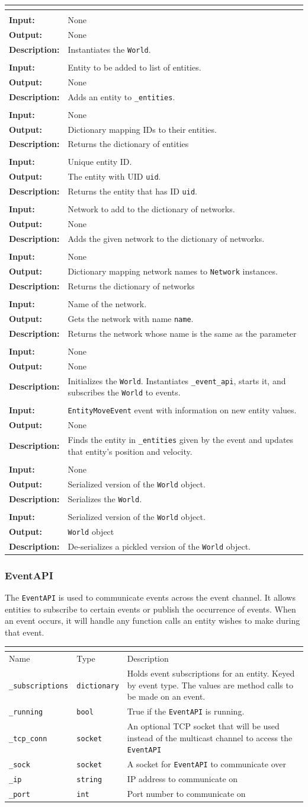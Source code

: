 \documentclass[titlepage]{article}
\newcommand{\operations}[1]{
\begin{center}
    \begin{longtable}{|p{4cm}|p{10cm + 2.0\tabcolsep}|}
    \hline
    \multicolumn{2}{|l|}{\cellcolor[gray]{0.5}{\textbf{Operations}}} \\ \hline
#1
    \end{longtable}
\end{center}
}
\newcommand{\operation}[4]{
    \hline
    \multicolumn{2}{|l|}{\cellcolor[gray]{0.8}{\texttt{#1}}} \\ \hline
    \hspace{7pt}\textbf{Input:} & #2 \\ \hline
    \hspace{7pt}\textbf{Output:} & #3 \\ \hline
    \hspace{7pt}\textbf{Description:} & #4 \\ \hline
}
\newcommand{\attributes}[1]{
    \begin{center}
        \begin{tabular}{|p{3.5cm}|p{3.5cm}|p{7cm}|}
            \multicolumn{3}{|l|}{\cellcolor[gray]{0.5}{\textbf{Attributes}}} \\ \hline
            \rowcolor[gray]{0.8} Name & Type & Description \\ \hline 
            #1
        \end{tabular}
    \end{center}
}
\newcommand{\attribute}[3]{
    \texttt{#1} & \texttt{#2} & #3 \\ \hline
}
\begin{document}
\operations{
    \operation{\_\_init\_\_()}{None}{None}{Instantiates the \texttt{World}.}
    \operation{add\_entity(entity)}{Entity to be added to list of entities.}{None}{Adds an entity to \texttt{\_entities}.}
    \operation{get\_entities()}{None}{Dictionary mapping IDs to their entities.}{Returns the dictionary of entities}
    \operation{get\_entity(uid)}{Unique entity ID.}{The entity with UID \texttt{uid}.}{Returns the entity that has ID \texttt{uid}.}
    \operation{add\_network(network)}{Network to add to the dictionary of networks.}{None}{Adds the given network to the dictionary of networks. }
    \operation{get\_networks()}{None}{Dictionary mapping network names to \texttt{Network} instances.}{Returns the dictionary of networks}
    \operation{get\_network(name)}{Name of the network.}{Gets the network with name \texttt{name}.}{Returns the network whose name is the same as the parameter}
    \operation{initialize()}{None}{None}{Initializes the \texttt{World}. Instantiates \texttt{\_event\_api}, starts it, and subscribes the \texttt{World} to events.}
    \operation{\_on\_entity\_move(event)}{\texttt{EntityMoveEvent} event with information on new entity values.}{None}{Finds the entity in \texttt{\_entities} given by the event and updates that entity's position and velocity.}
    \operation{pickle()}{None}{Serialized version of the \texttt{World} object.}{Serializes the \texttt{World}.}
    \operation{from\_pickle(pickled)}{Serialized version of the \texttt{World} object.}{\texttt{World} object}{De-serializes a pickled version of the \texttt{World} object.}
}
    
\subsubsection{EventAPI}
{The \texttt{EventAPI} is used to communicate events across the event channel. It allows entities to subscribe to certain events or publish the occurrence of events. When an event occurs, it will handle any function calls an entity wishes to make during that event.}

\attributes{
    \attribute{\_subscriptions}{dictionary}{Holds event subscriptions for an entity. Keyed by event type. The values are method calls to be made on an event.}
    \attribute{\_running}{bool}{True if the \texttt{EventAPI} is running.}
    \attribute{\_tcp\_conn}{socket}{An optional TCP socket that will be used instead of the multicast channel to access the \texttt{EventAPI}}
    \attribute{\_sock}{socket}{A socket for \texttt{EventAPI} to communicate over}
    \attribute{\_ip}{string}{IP address to communicate on}
    \attribute{\_port}{int}{Port number to communicate on}
}
\end{document}
